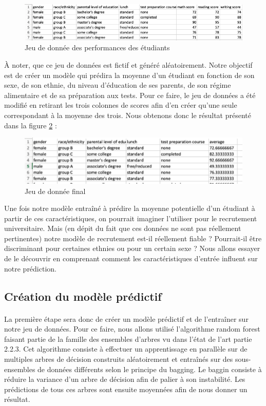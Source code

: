 \begin{figure}[h]
    \includegraphics[scale=0.65]{src_img/studentsPerformanceDataSet.png}
    \caption{Jeu de donnée des performances des étudiants}
    \label{studentsPerformanceDataSet}
\end{figure}

À noter, que ce jeu de données est fictif et généré aléatoirement. Notre objectif est de créer un modèle qui prédira la moyenne d’un étudiant en fonction de son sexe, de son ethnie, du niveau d’éducation de ses parents, de son régime alimentaire et de sa préparation aux tests. Pour ce faire, le jeu de données a été modifié en retirant les trois colonnes de scores afin d'en créer qu'une seule correspondant à la moyenne des trois. Nous obtenons donc le résultat présenté dans la figure \ref{studentsPerformanceDataSetModif} : 
\begin{figure}[h]
    \includegraphics[scale=1]{src_img/StudentsPerformanceDataSetModif.png}
    \caption{Jeu de donnée final}
    \label{studentsPerformanceDataSetModif}
\end{figure}

Une fois notre modèle entraîné à prédire la moyenne potentielle d'un étudiant à partir de ces caractéristiques, on pourrait imaginer l'utiliser pour le recrutement universitaire. Mais (en dépit du fait que ces données ne sont pas réellement pertinentes) notre modèle de recrutement est-il réellement fiable ? Pourrait-il être discriminant pour certaines ethnies ou pour un certain sexe ? Nous allons essayer de le découvrir en comprenant comment les caractéristiques d'entrée influent sur notre prédiction.

\subsection{Création du modèle prédictif}
\paragraph{}La première étape sera donc de créer un modèle prédictif et de l'entraîner sur notre jeu de données. Pour ce faire, nous allons utilisé l'algorithme random forest faisant partie de la famille des ensembles d'arbres vu dans l'état de l'art partie 2.2.3. Cet algorithme consiste à effectuer un apprentissage en parallèle sur de multiples arbres de décision construits aléatoirement et entraînés sur des sous-ensembles de données différents selon le principe du bagging. Le baggin consiste à réduire la variance d'un arbre de décision afin de palier à son instabilité. Les prédictions de tous ces arbres sont ensuite moyennées afin de nous donner un résultat.

